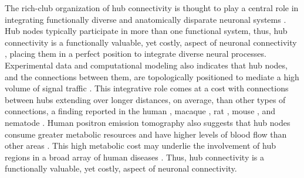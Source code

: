 \documentclass[10pt,letterpaper]{article}
\begin{document}
The rich-club organization of hub connectivity is thought to play a central role in integrating functionally diverse and anatomically disparate neuronal systems \cite{Fornito2015, VandenHeuvel2013a, ZamoraLopez:2010hy, Crossley2014, Crossley:2013kl}.
Hub nodes typically participate in more than one functional system, thus, hub connectivity is a functionally valuable, yet costly, aspect of neuronal connectivity \cite{deReus:2013cy, deReus:2014cz, ZamoraLopez:2010hy}, placing them in a perfect position to integrate diverse neural processes.
Experimental data and computational modeling also indicates that hub nodes, and the connections between them, are topologically positioned to mediate a high volume of signal traffic \cite{vandenHeuvel:2012kh, Harriger2012, Misic:2014it, Misic:2015jw}.
This integrative role comes at a cost with connections between hubs extending over longer distances, on average, than other types of connections, a finding reported in the human \cite{vandenHeuvel:2012kh}, macaque \cite{Harriger2012}, rat \cite{VandenHeuvel2016b}, mouse \cite{Fulcher:2016ck}, and nematode \cite{Towlson2013}.
Human positron emission tomography also suggests that hub nodes consume greater metabolic resources and have higher levels of blood flow than other areas \cite{Tomasi:2013kl, Collin:2014kq, Liang2013a}.
This high metabolic cost may underlie the involvement of hub regions in a broad array of human diseases \cite{Fornito2015, Bullmore:2012vl, Crossley:2014eta}. Thus, hub connectivity is a functionally valuable, yet costly, aspect of neuronal connectivity.
\end{document}
